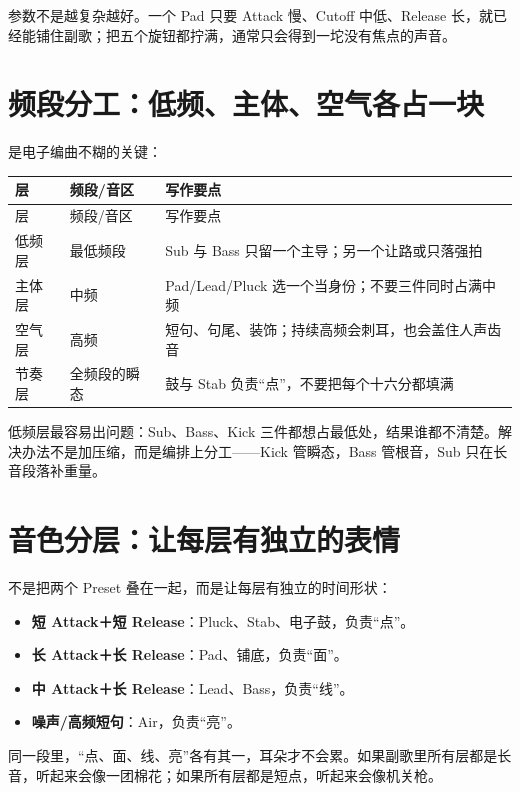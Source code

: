 参数不是越复杂越好。一个 Pad 只要 Attack 慢、Cutoff 中低、Release 长，就已经能铺住副歌；把五个旋钮都拧满，通常只会得到一坨没有焦点的声音。

\section{频段分工：低频、主体、空气各占一块}
\label{sec:frequency-roles}

是电子编曲不糊的关键：

\begin{longtable}{p{}p{}p{}}
\toprule
层 & 频段/音区 & 写作要点 \\
\midrule
\endfirsthead
\toprule
层 & 频段/音区 & 写作要点 \\
\midrule
\endhead
低频层 & 最低频段 & Sub 与 Bass 只留一个主导；另一个让路或只落强拍 \\
主体层 & 中频 & Pad/Lead/Pluck 选一个当身份；不要三件同时占满中频 \\
空气层 & 高频 & 短句、句尾、装饰；持续高频会刺耳，也会盖住人声齿音 \\
节奏层 & 全频段的瞬态 & 鼓与 Stab 负责“点”，不要把每个十六分都填满 \\
\bottomrule
\end{longtable}

低频层最容易出问题：Sub、Bass、Kick 三件都想占最低处，结果谁都不清楚。解决办法不是加压缩，而是编排上分工——Kick 管瞬态，Bass 管根音，Sub 只在长音段落补重量。

\section{音色分层：让每层有独立的表情}
\label{sec:timbre-layering}

不是把两个 Preset 叠在一起，而是让每层有独立的时间形状：

\begin{itemize}
\item \textbf{短 Attack＋短 Release}：Pluck、Stab、电子鼓，负责“点”。
\item \textbf{长 Attack＋长 Release}：Pad、铺底，负责“面”。
\item \textbf{中 Attack＋长 Release}：Lead、Bass，负责“线”。
\item \textbf{噪声/高频短句}：Air，负责“亮”。
\end{itemize}

同一段里，“点、面、线、亮”各有其一，耳朵才不会累。如果副歌里所有层都是长音，听起来会像一团棉花；如果所有层都是短点，听起来会像机关枪。

